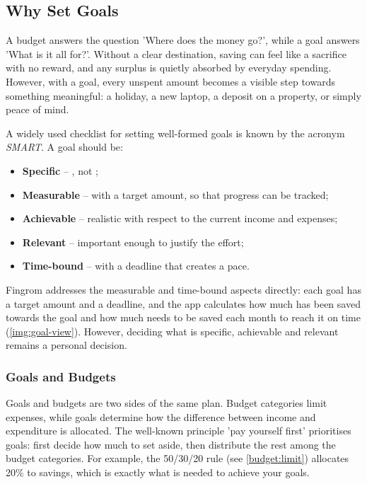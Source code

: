 
\subsection{Why Set Goals}

A budget answers the question 'Where does the money go?', while a goal answers 'What is it
all for?'. Without a clear destination, saving can feel like a sacrifice with no reward, and
any surplus is quietly absorbed by everyday spending. However, with a goal, every unspent
amount becomes a visible step towards something meaningful: a holiday, a new laptop, a
deposit on a property, or simply peace of mind.

A widely used checklist for setting well-formed goals is known by the acronym \emph{SMART}.
A goal should be:

\begin{itemize}
  \item \textbf{Specific} -- , not ;
  \item \textbf{Measurable} -- with a target amount, so that progress can be tracked;
  \item \textbf{Achievable} -- realistic with respect to the current income and expenses;
  \item \textbf{Relevant} -- important enough to justify the effort;
  \item \textbf{Time-bound} -- with a deadline that creates a pace.
\end{itemize}

\noindent Fingrom addresses the measurable and time-bound aspects directly: each goal has a
target amount and a deadline, and the app calculates how much has been saved towards the goal
and how much needs to be saved each month to reach it on time (\cref{img:goal-view}).
However, deciding what is specific, achievable and relevant remains a personal decision.



\subsubsection{Goals and Budgets}

Goals and budgets are two sides of the same plan. Budget categories limit expenses, while
goals determine how the difference between income and expenditure is allocated. The
well-known principle 'pay yourself first' prioritises goals: first decide how much to set
aside, then distribute the rest among the budget categories. For example, the 50/30/20 rule
(see \cref{budget:limit}) allocates 20\% to savings, which is exactly what is needed to
achieve your goals.

